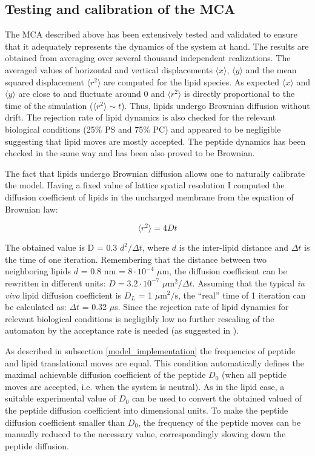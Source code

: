 \subsection{Testing and calibration of the MCA}

\label{testing_calibration_MCA}

The MCA described above has been extensively tested and validated to ensure that it adequately represents the dynamics of the system at hand. The results are obtained from averaging over several thousand independent realizations. The averaged values of horizontal and vertical displacements $\langle x\rangle$, $\langle y\rangle$ and the mean squared displacement $\langle r^2\rangle$ are computed for the lipid species. As expected $\langle x\rangle$ and $\langle y\rangle$ are close to and fluctuate around 0 and $\langle r^2\rangle$ is directly proportional to the time of the simulation ($\langle r^2\rangle\sim t$). Thus, lipids undergo Brownian diffusion without drift. The rejection rate of lipid dynamics is also checked for the relevant biological conditions (25$\%$ PS and 75$\%$ PC) and appeared to be negligible suggesting that lipid moves are mostly accepted. The peptide dynamics has been checked in the same way and has been also proved to be Brownian.

The fact that lipids undergo Brownian diffusion allows one to naturally calibrate the model. Having a fixed value of lattice spatial resolution I computed the diffusion coefficient of lipids in the uncharged membrane from the equation of Brownian law:

\begin{equation}
 \langle r^2\rangle = 4Dt
\end{equation}

The obtained value is D = 0.3 $d^2/\Delta t$, where $d$ is the inter-lipid distance and $\Delta t$ is the time of one iteration. Remembering that the distance between two neighboring lipids $d$ = 0.8  nm = $8\cdotp10^{-4}$ $\mu$m, the diffusion coefficient can be rewritten in different units: $D = 3.2\cdotp10^{-7}$ $\mu$m$^2$/$\Delta t$. Assuming that the typical \emph{in vivo} lipid diffusion coefficient is $D_L$ = 1 $\mu\text{m}^2/\text{s}$, the ``real'' time of 1 iteration can be calculated as: $\Delta t$ = 0.32 $\mu$s. Since the rejection rate of lipid dynamics for relevant biological conditions is negligibly low no further rescaling of the automaton by the acceptance rate is needed (as suggested in \cite{Sanz2010}).

As described in subsection \ref{model_implementation} the frequencies of peptide and lipid translational moves are equal. This condition automatically defines the maximal achievable diffusion coefficient of the peptide $D_0$ (when all peptide moves are accepted, i.e. when the system is neutral). As in the lipid case, a suitable experimental value of $D_0$ can be used to convert the obtained valued of the peptide diffusion coefficient into dimensional units. To make the peptide diffusion coefficient smaller than $D_0$, the frequency of the peptide moves can be manually reduced to the necessary value, correspondingly slowing down the peptide diffusion.

